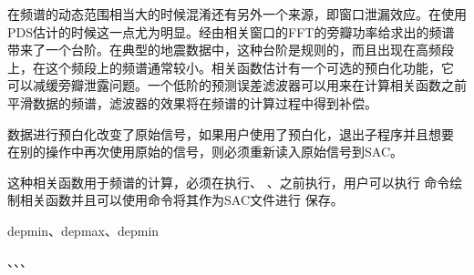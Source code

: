 在频谱的动态范围相当大的时候混淆还有另外一个来源，即窗口泄漏效应。在使用
PDS估计的时候这一点尤为明显。经由相关窗口的FFT的旁瓣功率给求出的频谱
带来了一个台阶。在典型的地震数据中，这种台阶是规则的，而且出现在高频段
上，在这个频段上的频谱通常较小。相关函数估计有一个可选的预白化功能，它
可以减缓旁瓣泄露问题。一个低阶的预测误差滤波器可以用来在计算相关函数之前
平滑数据的频谱，滤波器的效果将在频谱的计算过程中得到补偿。

数据进行预白化改变了原始信号，如果用户使用了预白化，退出子程序并且想要
在别的操作中再次使用原始的信号，则必须重新读入原始信号到SAC。

这种相关函数用于频谱的计算，必须在执行、
、之前执行，用户可以执行
命令绘制相关函数并且可以使用命令将其作为SAC文件进行
保存。

depmin、depmax、depmin

、、、
